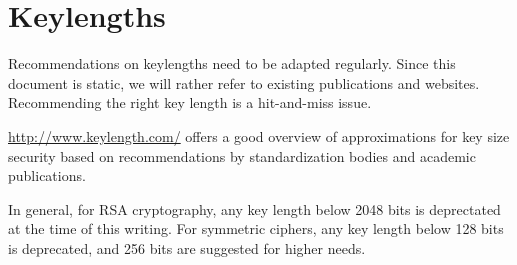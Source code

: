 \section{Keylengths}
\label{section:keylengths}

Recommendations on keylengths need to be adapted regularly. Since this document is static, we will rather refer to 
existing publications and websites.  Recommending the right key length is a hit-and-miss issue.

\url{http://www.keylength.com/} offers a good overview of approximations for key size security based on recommendations by standardization bodies and academic publications.

In general, for RSA cryptography, any key length below 2048 bits is deprectated at the time of this writing.
For symmetric ciphers, any key length below 128 bits is deprecated, and 256 bits are suggested for higher needs.





